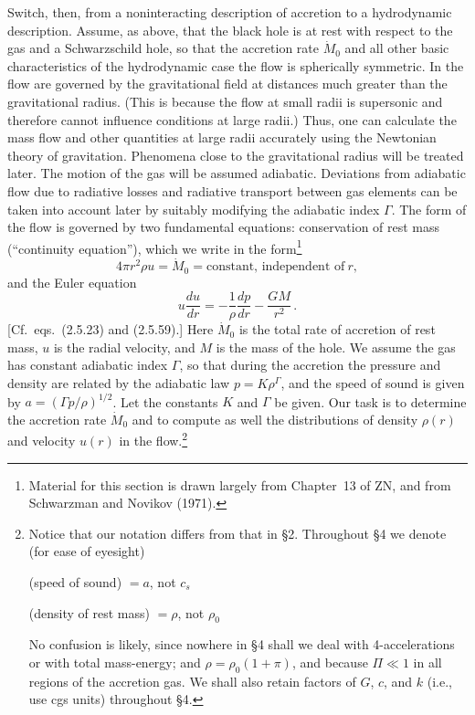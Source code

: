 Switch, then, from a noninteracting description of accretion to a hydrodynamic
description. Assume, as above, that the black hole is at rest with respect to the gas
and a Schwarzschild hole, so that the accretion rate $\dot{M}_0$ and all other basic characteristics of the
hydrodynamic case the flow is spherically symmetric. In the
flow are governed by the gravitational field at distances much greater than the
gravitational radius. (This is because the flow at small radii is supersonic and
therefore cannot influence conditions at large radii.) Thus, one can calculate
the mass flow and other quantities at large radii accurately using the Newtonian
theory of gravitation. Phenomena close to the gravitational radius will be treated
later. The motion of the gas will be assumed adiabatic. Deviations from adiabatic
flow due to radiative losses and radiative transport between gas elements can be
taken into account later by suitably modifying the adiabatic index $\Gamma$.
The form of the flow is governed by two fundamental equations: conservation
of rest mass (``continuity equation''), which we write in the form\footnote{Material for this section is drawn largely from Chapter~13 of ZN, and from Schwarzman and Novikov (1971).}
%
\begin{equation}
4\pi r^2 \rho u = \dot{M}_0 = \text{constant, independent of}~r,
\tag{4.2.1}
\end{equation}
%
and the Euler equation
%
\begin{equation}
u\frac{du}{dr} = -\frac{1}{\rho}\frac{dp}{dr} - \frac{GM}{r^2}\,.
\tag{4.2.2}
\end{equation}
%
[Cf.\ eqs.\ (2.5.23) and (2.5.59).]
Here $\dot{M}_0$ is the total rate of accretion of rest mass, $u$ is the radial velocity, and
$M$ is the mass of the hole. We assume the gas has constant adiabatic index
$\Gamma$, so that during the accretion the pressure and density are related by the
adiabatic law $p = K\rho^\Gamma$, and the speed of sound is given by $a = (\Gamma p/\rho)^{1/2}$. Let
the constants $K$ and $\Gamma$ be given. Our task is to determine the accretion rate $\dot{M}_0$
and to compute as well the distributions of density $\rho(r)$ and velocity $u(r)$ in the
flow.\footnote{Notice that our notation differs from that in \S2. Throughout \S4 we denote (for ease of
eyesight)

(speed of sound) $= a$, not $c_s$

(density of rest mass) $= \rho$, not $\rho_0$

No confusion is likely, since nowhere in \S4 shall we deal with 4-accelerations or with
total mass-energy; and $\rho = \rho_0(1 + \pi)$, and because $\Pi \ll 1$ in all regions of the accretion gas.
We shall also retain factors of $G$, $c$, and $k$ (i.e., use cgs units) throughout \S4.}

